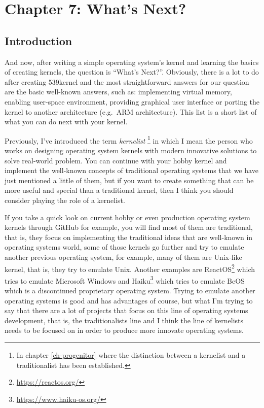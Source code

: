 \chapter{Chapter 7: What's Next?}\label{ch-wthat-is-next}

\section{Introduction}\label{introduction}

And now, after writing a simple operating system's kernel and learning
the basics of creating kernels, the question is ``What's Next?''.
Obviously, there is a lot to do after creating 539kernel and the most
straightforward answers for our question are the basic well-known
answers, such as: implementing virtual memory, enabling user-space
environment, providing graphical user interface or porting the kernel to
another architecture (e.g.~ARM architecture). This list is a short list
of what you can do next with your kernel.

Previously, I've introduced the term \emph{kernelist} \footnote{In
  chapter \ref{ch-progenitor} where the distinction between a kernelist
  and a traditionalist has been established.} in which I mean the person
who works on designing operating system kernels with modern innovative
solutions to solve real-world problem. You can continue with your hobby
kernel and implement the well-known concepts of traditional operating
systems that we have just mentioned a little of them, but if you want to
create something that can be more useful and special than a traditional
kernel, then I think you should consider playing the role of a
kernelist.

If you take a quick look on current hobby or even production operating
system kernels through GitHub for example, you will find most of them
are traditional, that is, they focus on implementing the traditional
ideas that are well-known in operating systems world, some of those
kernels go further and try to emulate another previous operating system,
for example, many of them are Unix-like kernel, that is, they try to
emulate Unix. Another examples are ReactOS\footnote{\url{https://reactos.org/}}
which tries to emulate Microsoft Windows and Haiku\footnote{\url{https://www.haiku-os.org/}}
which tries to emulate BeOS which is a discontinued proprietary
operating system. Trying to emulate another operating systems is good
and has advantages of course, but what I'm trying to say that there are
a lot of projects that focus on this line of operating systems
development, that is, the traditionalists line and I think the line of
kernelists needs to be focused on in order to produce more innovate
operating systems.

